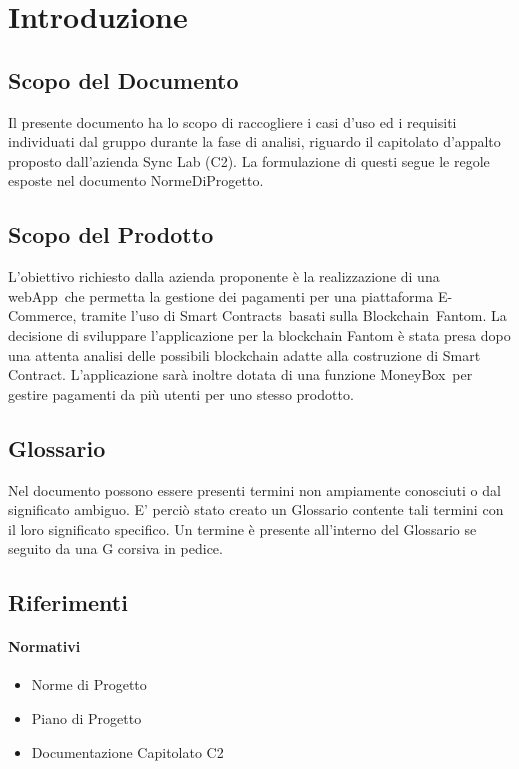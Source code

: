 \section{Introduzione}

\subsection{Scopo del Documento}
Il presente documento ha lo scopo di raccogliere i casi d'uso ed i requisiti individuati dal gruppo
durante la fase di analisi, riguardo il capitolato d'appalto proposto dall'azienda Sync Lab (C2). La formulazione di questi segue le regole esposte nel documento
NormeDiProgetto.

\subsection{Scopo del Prodotto}
L'obiettivo richiesto dalla azienda proponente è la realizzazione di una webApp\glo\ che permetta la gestione dei pagamenti per una piattaforma E-Commerce, tramite l'uso di Smart Contracts\glo\ basati sulla Blockchain\glo\ Fantom\glo.
La decisione di sviluppare l'applicazione per la blockchain Fantom è stata presa dopo una attenta analisi delle possibili blockchain adatte alla costruzione di Smart Contract.
L'applicazione sarà inoltre dotata di una funzione MoneyBox\glo\ per gestire pagamenti da più utenti per uno stesso prodotto.

\subsection{Glossario}
Nel documento possono essere presenti termini non ampiamente conosciuti o dal significato ambiguo. E' perciò stato creato
un Glossario contente tali termini con il loro significato specifico. Un termine è presente
all’interno del Glossario se seguito da una G corsiva in pedice.

\subsection{Riferimenti}

\paragraph{Normativi}
\begin{itemize}
    \item Norme di Progetto
    \item Piano di Progetto
    \item Documentazione Capitolato C2
\end{itemize}

